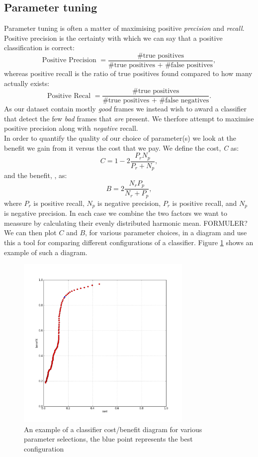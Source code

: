 \subsection{Parameter tuning}\label{sec:ph1tweaking}
%
Parameter tuning is often a matter of maximising positive \textit{precision} and \textit{recall}. Positive precision is the certainty with which we can say that a positive classification is correct:
\[
\text{Positive Precision } = \frac{\text{\#true positives}}{\text{\#true positives + \#false positives}},
\]
whereas positive recall is the ratio of true positives found compared to how many actually exists:
\[
\text{Positive Recal } = \frac{\text{\#true positives}}{\text{\#true positives + \#false negatives}}.
\]
As our dataset contain mostly \textit{good} frames we instead wish to award a classifier that detect the few \textit{bad} frames that \textit{are} present. We therfore attempt to maximise positive precision along with \textit{negative} recall.\\
In order to quantify the quality of our choice of parameter(s) we look at the benefit we gain from it versus the cost that we pay. We define the cost, \textit{C} as:
%
\[
C = 1 - 2\frac{P_{r}N_{p}}{P_{r} + N_{p}},
\]
%
and the benefit, , as:
%
\[
B = 2\frac{N_{r} P_{p}}{N_{r} + P_{p}},
\]
%
where $P_r$ is positive recall, $N_p$ is negative precision, $P_r$ is positive recall, and $N_p$ is negative precision. In each case we combine the two factors we want to meassure by calculating their evenly distributed harmonic mean. FORMULER? We can then plot $C$ and $B$, for various parameter choices, in a diagram and use this a tool for comparing different configurations of a classifier. Figure \ref{fig:costbenefitdiagram} shows an example of such a diagram.
%
\begin{figure}
     \centering
     \includegraphics[width=0.75\textwidth]{img/2dcostbenefitexample2.jpg}
     \caption{An example of a classifier cost/benefit diagram for various parameter selections, the blue point represents the best configuration}
     \label{fig:costbenefitdiagram}
\end{figure}
